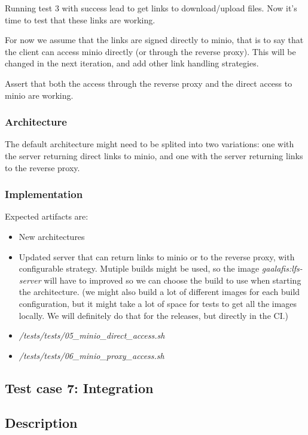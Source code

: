 Running test 3 with success lead to get links to download/upload files. Now it's time to test that these links are working.

For now we assume that the links are signed directly to minio, that is to say that the client can access minio directly (or through the reverse proxy). This will be changed in the next iteration, and add other link handling strategies.

Assert that both the access through the reverse proxy and the direct access to minio are working.

\subsubsection{Architecture}

The default architecture might need to be splited into two variations: one with the server returning direct links to minio, and one with the server returning links to the reverse proxy.

\subsubsection{Implementation}

Expected artifacts are:

\begin{itemize}
    \item New architectures
    \item Updated server that can return links to minio or to the reverse proxy, with configurable strategy. Mutiple builds might be used, so the image \textit{gaalafis:lfs-server} will have to improved so we can choose the build to use when starting the architecture. (we might also build a lot of different images for each build configuration, but it might take a lot of space for tests to get all the images locally. We will definitely do that for the releases, but directly in the CI.)
    \item \textit{/tests/tests/05\_minio\_direct\_access.sh}
    \item \textit{/tests/tests/06\_minio\_proxy\_access.sh}
\end{itemize}

\subsection{Test case 7: Integration}

\subsection{Description}

